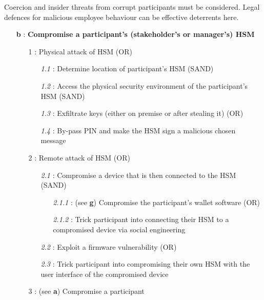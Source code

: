 \documentclass[runningheads]{llncs}
\begin{document}
\noindent Coercion and insider threats from corrupt participants must be considered. Legal defences for malicious employee behaviour can be effective deterrents here. 

{\footnotesize
\begin{itemize}[noitemsep,parsep=0pt,partopsep=0pt, leftmargin=0.7cm]
\item[\textbf{b} :] \textbf{Compromise a participant's (stakeholder's or manager's) HSM }
\begin{itemize}[noitemsep,topsep=0pt,parsep=0pt,partopsep=0pt, leftmargin=0.8cm]
\item[1 :] Physical attack of HSM (OR)
\begin{itemize}[noitemsep,topsep=0pt,parsep=0pt,partopsep=0pt, leftmargin=0.9cm]
\item[\textit{1.1} :] Determine location of participant’s HSM (SAND)
\item[\textit{1.2} :] Access the physical security environment of the participant’s HSM (SAND)
\item[\textit{1.3} :] Exfiltrate keys (either on premise or after stealing it) (OR)
\item[\textit{1.4} :] By-pass PIN and make the HSM sign a malicious chosen message
\end{itemize}
\item[2 :] Remote attack of HSM (OR)
\begin{itemize}[noitemsep,topsep=0pt,parsep=0pt,partopsep=0pt, leftmargin=0.9cm]
\item[\textit{2.1} :] Compromise a device that is then connected to the HSM (SAND)
\begin{itemize}[noitemsep,topsep=0pt,parsep=0pt,partopsep=0pt, leftmargin=1cm]
\item[\textit{2.1.1} :] (see \textbf{g}) Compromise the participant's wallet software (OR)
\item[\textit{2.1.2} :] Trick participant into connecting their HSM to a compromised device via social engineering
\end{itemize}
\item[\textit{2.2} :] Exploit a firmware vulnerability (OR)
\item[\textit{2.3} :] Trick participant into compromising their own HSM with the user interface of the compromised device
\end{itemize}
\item[3 :](see \textbf{a})  Compromise a participant
\end{itemize}
\end{itemize}
}
\end{document}
